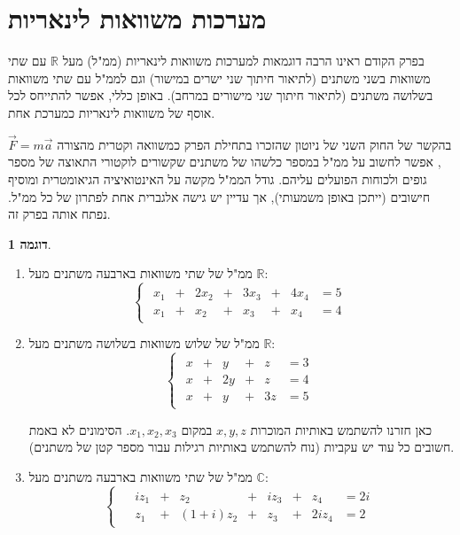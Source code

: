 \documentclass[12pt]{report}
\theoremstyle{plain}
\theoremstyle{definition}
\newtheorem{example}{דוגמה}[chapter]
\newcommand{\R}{\mathbb{R}}
\newcommand{\C}{\mathbb{C}}
\newcommand{\0}{\mathbf{0}}
\begin{document}
\section{מערכות משוואות לינאריות}

בפרק הקודם ראינו הרבה דוגמאות למערכות משוואות לינאריות (ממ"ל)
מעל $\R$ עם שתי משוואות בשני משתנים (לתיאור חיתוך שני
ישרים במישור) וגם לממ"ל עם שתי משוואות בשלושה משתנים
(לתיאור חיתוך שני מישורים במרחב).
באופן כללי, אפשר להתייחס לכל אוסף של משוואות לינאריות כמערכת אחת.

בהקשר של החוק השני של ניוטון שהזכרו בתחילת הפרק כמשוואה וקטרית מהצורה
$\vec{F}=m\vec{a}$,
אפשר לחשוב על ממ"ל במספר כלשהו של משתנים שקשורים לוקטורי התאוצה של מספר גופים ולכוחות הפועלים
עליהם. גודל הממ"ל מקשה על האינטואיציה הגיאומטרית ומוסיף
חישובים (ייתכן באופן משמעותי), אך עדיין יש גישה אלגברית אחת לפתרון
של כל ממ"ל. נפתח אותה בפרק זה.

\begin{example}\
\begin{enumerate}[label=\alph*.]
\item
ממ"ל של שתי משוואות בארבעה משתנים מעל $\R$:
$$
\begin{cases}
\begin{alignedat}{7}
x_1 &{}+{}& 2x_2 &{}+{}& 3x_3 &{}+{}& 4x_4 &= 5 \\[4pt]
x_1 &{}+{}&  x_2 &{}+{}&  x_3 &{}+{}&  x_4 &= 4
\end{alignedat}
\end{cases}
$$

\item
ממ"ל של שלוש משוואות בשלושה משתנים מעל $\R$:
$$
\begin{cases}
\begin{alignedat}{7}
x &{}+{}&  y &{}+{}&  z &= 3 \\[4pt]
x &{}+{}& 2y &{}+{}&  z &= 4 \\[4pt]
x &{}+{}&  y &{}+{}& 3z &= 5
\end{alignedat}
\end{cases}
$$

כאן חזרנו להשתמש באותיות המוכרות $x,y,z$ במקום $x_1,x_2,x_3$.
הסימונים לא באמת חשובים כל עוד יש עקביות (נוח להשתמש באותיות רגילות
עבור מספר קטן של משתנים). 

\item
ממ"ל של שתי משוואות בארבעה משתנים מעל $\C$:
$$
\begin{cases}
\begin{alignedat}{8}
 & i z_1  &{}+{}&      z_2 &{}+{}&  i z_3 &{}+{}&     z_4 &= 2i \\[4pt]
 &   z_1  &{}+{}& (1+i)z_2 &{}+{}&      z_3 &{}+{}& 2i z_4 &= 2
\end{alignedat}
\end{cases}
$$
\end{enumerate}
\end{example}
\end{document}
